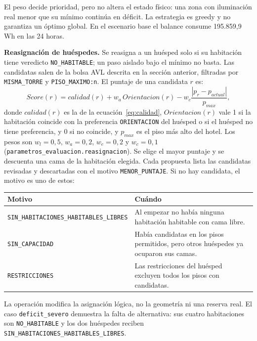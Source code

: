 \documentclass[12pt,a4paper]{article}
\newcommand{\estado}[1]{\texttt{#1}}
\newcommand{\codigo}[1]{\texttt{#1}}
\begin{document}
El peso decide prioridad, pero no altera el estado físico: una zona con iluminación real menor que su mínimo continúa en déficit. La estrategia es greedy y no garantiza un óptimo global. En el escenario base el balance consume 195.859,9 Wh en las 24 horas.

\textbf{Reasignación de huéspedes.} Se reasigna a un huésped solo si su habitación tiene veredicto \estado{NO\_HABITABLE}; un paso aislado bajo el mínimo no basta. Las candidatas salen de la bolsa AVL descrita en la sección anterior, filtradas por \codigo{MISMA\_TORRE} y \codigo{PISO\_MAXIMO:n}. El puntaje de una candidata $r$ es:
\begin{equation}
 Score(r)=calidad(r)+w_a\,Orientacion(r)-w_c\frac{|p_r-p_{actual}|}{p_{max}},
 \label{eq:score}
\end{equation}
donde $calidad(r)$ es la de la ecuación~\ref{eq:calidad}, $Orientacion(r)$ vale 1 si la habitación coincide con la preferencia \codigo{ORIENTACION} del huésped o si el huésped no tiene preferencia, y 0 si no coincide, y $p_{max}$ es el piso más alto del hotel. Los pesos son $w_l=0,5$, $w_a=0,2$, $w_e=0,2$ y $w_c=0,1$ (\codigo{parametros\_evaluacion.reasignacion}). Se elige el mayor puntaje y se descuenta una cama de la habitación elegida. Cada propuesta lista las candidatas revisadas y descartadas con el motivo \codigo{MENOR\_PUNTAJE}. Si no hay candidata, el motivo es uno de estos:

\begin{center}\small
\begin{tabular}{p{}p{}}
\toprule
\textbf{Motivo} & \textbf{Cuándo}\\
\midrule
\codigo{SIN\_HABITACIONES\_HABITABLES\_LIBRES} & Al empezar no había ninguna habitación habitable con cama libre.\\
\codigo{SIN\_CAPACIDAD} & Había candidatas en los pisos permitidos, pero otros huéspedes ya ocuparon sus camas.\\
\codigo{RESTRICCIONES} & Las restricciones del huésped excluyen todos los pisos con candidatas.\\
\bottomrule
\end{tabular}
\end{center}

La operación modifica la asignación lógica, no la geometría ni una reserva real. El caso \codigo{deficit\_severo} demuestra la falta de alternativa: sus cuatro habitaciones son \estado{NO\_HABITABLE} y los dos huéspedes reciben \codigo{SIN\_HABITACIONES\_HABITABLES\_LIBRES}.
\end{document}
